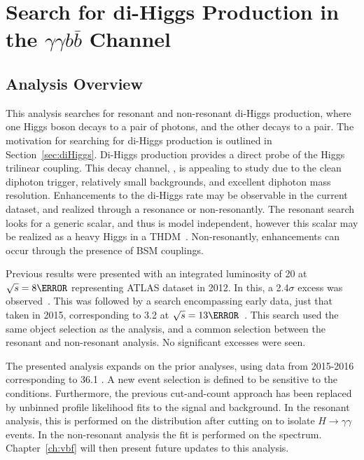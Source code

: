 \chapter{Search for di-Higgs Production in the \texorpdfstring{\lowercase{$\gamma\gamma b\bar{b}$}}{yybb} Channel}
\section{Analysis Overview}

This analysis searches for resonant and non-resonant di-Higgs production, where one Higgs boson decays to a pair of photons, and the other decays to a \bb pair. The motivation for searching for di-Higgs production is outlined in Section~\ref{sec:diHiggs}. Di-Higgs production provides a direct probe of the Higgs trilinear coupling. This decay channel, \yybb, is appealing to study due to the clean diphoton trigger, relatively small backgrounds, and excellent diphoton mass resolution. Enhancements to the di-Higgs rate may be observable in the current \RunTwo dataset, and realized through a resonance or non-resonantly. The resonant search looks for a generic scalar, and thus is model independent, however this scalar may be realized as a heavy Higgs in a \gls{THDM}~\cite{THDM}. Non-resonantly, enhancements can occur through the presence of \gls{BSM} couplings.


Previous results were presented with an integrated luminosity of 20 \ifb at $\sqrt{s}=\unit{8}{\TeV}$ representing ATLAS dataset in 2012. In this, a 2.4$\sigma$ excess was observed~\cite{yybb-2015}. This was followed by a search encompassing early \RunTwo data, just that taken in 2015, corresponding to 3.2 \ifb at $\sqrt{s}=\unit{13}{\TeV}$~\cite{run2_2015}. This search used the same object selection as the \RunOne analysis, and a common selection between the resonant and non-resonant analysis. No significant excesses were seen.

The presented analysis expands on the prior analyses, using \RunTwo data from 2015-2016 corresponding to 36.1 \ifb. A new event selection is defined to be sensitive to the \RunTwo conditions. Furthermore, the previous cut-and-count approach has been replaced by unbinned profile likelihood fits to the signal and background. In the resonant analysis, this is performed on the \myybb distribution after cutting on \myy to isolate $H\rightarrow \gamma \gamma$ events. In the non-resonant analysis the fit is performed on the \myy spectrum. Chapter~\ref{ch:vbf} will then present future updates to this analysis.


